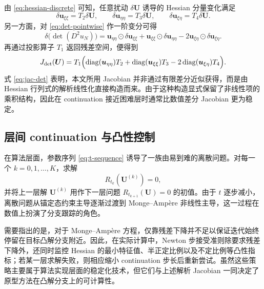 \documentclass[11pt,a4paper]{article}
\begin{document}
由 \eqref{eq:hessian-discrete} 可知，任意扰动 $\delta\bm U$ 诱导的 Hessian 分量变化满足
\begin{equation}
\delta\bm u_{\xi\xi}=T_2\delta\bm U,
\qquad
\delta\bm u_{\eta\eta}=T_3\delta\bm U,
\qquad
\delta\bm u_{\xi\eta}=T_4\delta\bm U.
\label{eq:delta-hessian}
\end{equation}
另一方面，对 \eqref{eq:det-pointwise} 作一阶变分可得
\begin{equation}
\delta\!\bigl(\det(D^2u_N)\bigr)
=
\bm u_{\eta\eta}\odot\delta\bm u_{\xi\xi}
+\bm u_{\xi\xi}\odot\delta\bm u_{\eta\eta}
-2\bm u_{\xi\eta}\odot\delta\bm u_{\xi\eta}.
\label{eq:det-linearization}
\end{equation}
再通过投影算子 $T_1$ 返回残差空间，便得到
\begin{equation}
J_{\det}(\bm U)
=
T_1\Bigl(
\mathrm{diag}(\bm u_{\eta\eta})T_2
+\mathrm{diag}(\bm u_{\xi\xi})T_3
-2\,\mathrm{diag}(\bm u_{\xi\eta})T_4
\Bigr).
\label{eq:jac-det}
\end{equation}
式 \eqref{eq:jac-det} 表明，本文所用 Jacobian 并非通过有限差分近似获得，而是由 Hessian 行列式的解析线性化直接构造而来。由于这种构造显式保留了非线性项的乘积结构，因此在 continuation 接近困难层时通常比数值差分 Jacobian 更为稳定。

\subsection{层间 continuation 与凸性控制}
在算法层面，参数序列 \eqref{eq:t-sequence} 诱导了一族由易到难的离散问题。对每一个 $k=0,1,\dots,K$，求解
\begin{equation}
R_{t_k}(\bm U^{(k)})=0,
\label{eq:level-problem}
\end{equation}
并将上一层解 $\bm U^{(k)}$ 用作下一层问题 $R_{t_{k+1}}(\bm U)=0$ 的初值。由于 $t$ 逐步减小，离散问题从锚定态约束主导逐渐过渡到 Monge--Amp\`ere 非线性主导，这一过程在数值上扮演了分支跟踪的角色。

需要指出的是，对于 Monge--Amp\`ere 方程，仅靠残差下降并不足以保证迭代始终停留在目标凸解分支附近。因此，在实际计算中，Newton 步接受准则除要求残差下降外，还同时监控 Hessian 的最小特征值、半正定比例以及不定比例等凸性指标；若某一层求解失败，则相应缩小 continuation 步长后重新尝试。虽然这些策略主要属于算法实现层面的稳定化技术，但它们与上述解析 Jacobian 一同决定了原型方法在凸解分支上的可计算性。
\end{document}
